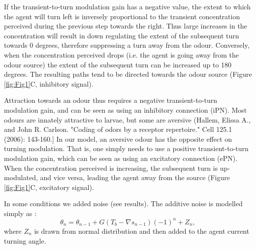 \documentclass[10pt,a4paper]{article}
\begin{document}
If the transient-to-turn modulation gain has a negative value, the extent to which the agent will turn left is inversely proportional to the transient concentration perceived during the previous step towards the right. Thus large increases in the concentration will result in down regulating the extent of the subsequent turn towards 0 degrees, therefore suppressing a turn away from the odour. Conversely, when the concentration perceived drops (i.e. the agent is going away from the odour source) the extent of the subsequent turn can be increased up to 180 degrees. The resulting paths tend to be directed towards the odour source (Figure \ref{fig:Fig1}C, inhibitory signal). 

Attraction towards an odour thus requires a negative transient-to-turn modulation gain, and can be seen as using an inhibitory connection (iPN).  Most odours are innately attractive to larvae, but some are aversive (Hallem, Elissa A., and John R. Carlson. "Coding of odors by a receptor repertoire." Cell 125.1 (2006): 143-160.] In our model, an aversive odour has the opposite effect on turning modulation. That is, one simply needs to use a positive transient-to-turn modulation gain, which can be seen as using an excitatory connection (ePN). When the concentration perceived is increasing, the subsequent turn is up-modulated, and vice versa, leading the agent away from the source (Figure \ref{fig:Fig1}C, excitatory signal).

In some conditions we added noise (see results). The additive noise is modelled simply as :
\begin{equation}
\theta_n = \theta_{n-1} + G (T_b - \nabla s_{n-1})(-1)^n + Z_n,
\end{equation}
where $Z_n$ is drawn from normal distribution and then added to the agent current turning angle. 

 
\end{document}
